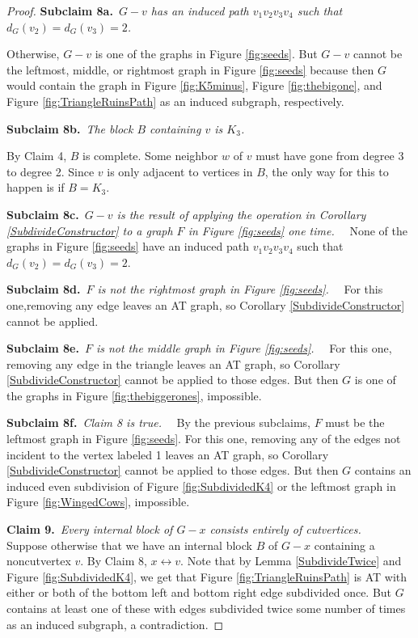 \documentclass[12pt]{article}
\theoremstyle{plain}
\theoremstyle{definition}
\theoremstyle{remark}
\def\adj{\leftrightarrow}
\newcommand{\claim}[2]{{\bf Claim #1.}~{\it #2}~~}
\newcommand{\subclaim}[2]{{\bf Subclaim #1.}~{\it #2}~~}
\def\adj{\leftrightarrow}
\begin{document}
\begin{proof}
	 \subclaim{8a}{$G-v$ has an induced path $v_1v_2v_3v_4$ such that $d_G(v_2) = d_G(v_3) = 2$.}
	 
	 Otherwise, $G-v$ is one of the graphs in Figure \ref{fig:seeds}.  But $G-v$ cannot be the leftmost, middle, or rightmost graph in Figure \ref{fig:seeds} because then $G$ would contain the graph in Figure \ref{fig:K5minus}, Figure \ref{fig:thebigone}, and Figure \ref{fig:TriangleRuinsPath} as an induced subgraph, respectively.  
	 	 
	 \subclaim{8b}{The block $B$ containing $v$ is $K_3$.}
	 
	 By Claim 4, $B$ is complete. Some neighbor $w$ of $v$ must have gone from degree 3 to degree 2. Since $v$ is only adjacent to vertices in $B$,	 
	 the only way for this to happen is if $B = K_3$.  
	 
	 \subclaim{8c}{$G-v$ is the result of applying the operation in Corollary \ref{SubdivideConstructor} to a graph $F$ in Figure \ref{fig:seeds} one time.}
	 None of the graphs in Figure \ref{fig:seeds} have an induced path $v_1v_2v_3v_4$ such that $d_G(v_2) = d_G(v_3) = 2$.

	 \subclaim{8d}{$F$ is not the rightmost graph in Figure \ref{fig:seeds}.}
	 For this one,removing any edge leaves an AT graph, so Corollary \ref{SubdivideConstructor} cannot be applied.
	
	 \subclaim{8e}{$F$ is not the middle graph in Figure \ref{fig:seeds}.}
 	  For this one, removing any edge in the triangle leaves an AT graph, so Corollary \ref{SubdivideConstructor} cannot be applied to those edges.  But then $G$ is one of the graphs in Figure \ref{fig:thebiggerones}, impossible.
	 
	 \subclaim{8f}{Claim 8 is true.}
	 By the previous subclaims, $F$ must be the leftmost graph in Figure \ref{fig:seeds}. For this one, removing any of the edges not incident to the vertex labeled 1 leaves an AT graph, so Corollary \ref{SubdivideConstructor} cannot be applied to those edges.  But then $G$ contains an induced even subdivision of Figure \ref{fig:SubdividedK4} or the leftmost graph in Figure \ref{fig:WingedCows}, impossible.
	 
	 \claim{9}{Every internal block of $G-x$ consists entirely of cutvertices.}
	 Suppose otherwise that we have an internal block $B$ of $G-x$ containing a noncutvertex $v$.  By Claim 8, $x \adj v$.  Note that by Lemma \ref{SubdivideTwice} and Figure \ref{fig:SubdividedK4}, we get that Figure \ref{fig:TriangleRuinsPath} is AT with either or both of the bottom left and bottom right edge subdivided once.  But $G$ contains at least one of these with edges subdivided twice some number of times as an induced subgraph, a contradiction.
	 

\end{proof}
\end{document}
